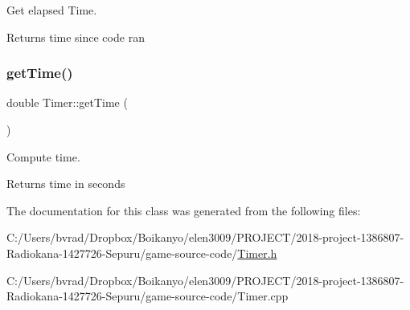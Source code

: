 Get elapsed Time. 

\begin{DoxyReturn}{Returns}
time since code ran 
\end{DoxyReturn}
\mbox{\label{class_timer_a490604efc23a4ff9bef8d1f9f418ecb2}} 
\subsubsection{\texorpdfstring{get\+Time()}{getTime()}}
{\footnotesize\ttfamily double Timer\+::get\+Time (\begin{DoxyParamCaption}{ }\end{DoxyParamCaption})\hspace{0.3cm}{\ttfamily [private]}}



Compute time. 

\begin{DoxyReturn}{Returns}
time in seconds 
\end{DoxyReturn}


The documentation for this class was generated from the following files\+:\begin{DoxyCompactItemize}
\item 
C\+:/\+Users/bvrad/\+Dropbox/\+Boikanyo/elen3009/\+P\+R\+O\+J\+E\+C\+T/2018-\/project-\/1386807-\/\+Radiokana-\/1427726-\/\+Sepuru/game-\/source-\/code/\mbox{\hyperlink{_timer_8h}{Timer.\+h}}\item 
C\+:/\+Users/bvrad/\+Dropbox/\+Boikanyo/elen3009/\+P\+R\+O\+J\+E\+C\+T/2018-\/project-\/1386807-\/\+Radiokana-\/1427726-\/\+Sepuru/game-\/source-\/code/Timer.\+cpp\end{DoxyCompactItemize}
